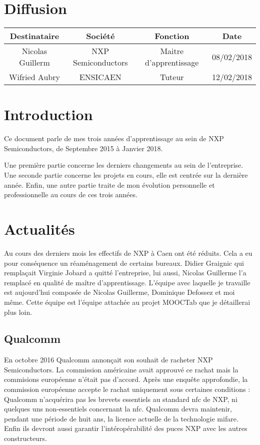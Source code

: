 \documentclass[french,12pt,a4paper,titlepage,openright,openbib]{report}
\begin{document}
{\let \clearpage \relax \chapter*{Diffusion}}
\begin{table}[ht]
	\label{tab:diffusion}
	\centering
	\begin{tabular}{|c|c|c|c|}
		\hline
		{\bf Destinataire} & {\bf Société}      & {\bf Fonction}   		 & {\bf Date}\\
		\hline
		Nicolas Guillerm   & NXP Semiconductors & Maitre d'apprentissage & 08/02/2018 \\
		\hline
		Wifried Aubry      & ENSICAEN 			& Tuteur				 & 12/02/2018 \\
		\hline
	\end{tabular}
\end{table}

\chapter{Introduction}

Ce document parle de mes trois années d'apprentissage au sein de NXP Semiconductors, de Septembre 2015 à Janvier 2018.

Une première partie concerne les derniers changements au sein de l'entreprise.
Une seconde partie concerne les projets en cours, elle est centrée sur la dernière année.
Enfin, une autre partie traite de mon évolution personnelle et professionnelle au cours de ces trois années.

\chapter{Actualités}

Au cours des derniers mois les effectifs de NXP à Caen ont été réduits. Cela a eu pour conséquence un réaménagement de certains bureaux.
Didier Graignic qui remplaçait Virginie Jobard a quitté l'entreprise, lui aussi, Nicolas Guillerme l'a remplacé en qualité de maître d'apprentissage.
L'équipe avec laquelle je travaille est aujourd'hui composée de Nicolas Guillerme, Dominique Defossez et moi même. Cette équipe est l'équipe attachée au projet MOOCTab que je détaillerai plus loin.


\section{Qualcomm}

En octobre 2016 Qualcomm annonçait son souhait de racheter NXP Semiconductors. La commission américaine avait approuvé ce rachat mais la commisions européenne n'était pas d'accord. Après une enquête approfondie, la commission européenne accepte le rachat uniquement sous certaines conditions :
Qualcomm n'acquérira pas les brevets essentiels au standard \gls{nfc} de NXP, ni quelques uns non-essentiels concernant la \gls{nfc}.
Qualcomm devra maintenir, pendant une période de huit ans, la licence actuelle de la technologie \gls{mifare}. Enfin ils devront aussi garantir l'intéropérabilité des puces NXP avec les autres constructeurs.
\end{document}
